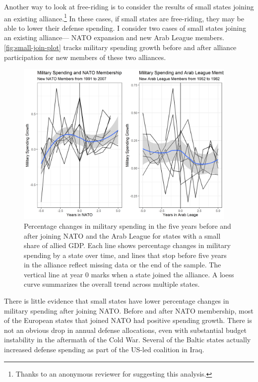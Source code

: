 \documentclass[12pt]{article}
\begin{document}
Another way to look at free-riding is to consider the results of small states joining an existing alliance.\footnote{Thanks to an anonymous reviewer for suggesting this analysis.} 
In these cases, if small states are free-riding, they may be able to lower their defense spending. 
I consider two cases of small states joining an existing alliance--- NATO expansion and new Arab League members. 
\autoref{fig:small-join-plot} tracks military spending growth before and after alliance participation for new members of these two alliances. 

\begin{figure}[htbp]
	\centering
		\includegraphics[width=0.95\textwidth]{small-join-plot.png}
	\caption{Percentage changes in military spending in the five years before and after joining NATO and the Arab League for states with a small share of allied GDP. Each line shows percentage changes in military spending by a state over time, and lines that stop before five years in the alliance reflect missing data or the end of the sample. The vertical line at year 0 marks when a state joined the alliance. A loess curve summarizes the overall trend across multiple states.}
	\label{fig:small-join-plot}
\end{figure}


There is little evidence that small states have lower percentage changes in military spending after joining NATO. 
Before and after NATO membership, most of the European states that joined NATO had positive spending growth. 
There is not an obvious drop in annual defense allocations, even with substantial budget instability in the aftermath of the Cold War.  
Several of the Baltic states actually increased defense spending as part of the US-led coalition in Iraq. 
\end{document}
